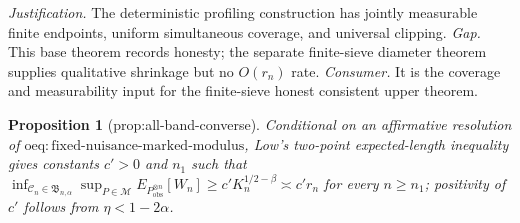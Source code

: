 \documentclass{article}
\newtheorem{proposition}{Proposition}
\begin{document}
\par\smallskip\noindent \textit{Justification.} The deterministic profiling construction has jointly measurable finite endpoints, uniform simultaneous coverage, and universal clipping. \textit{Gap.} This base theorem records honesty; the separate finite-sieve diameter theorem supplies qualitative shrinkage but no \(O(r_n)\) rate. \textit{Consumer.} It is the coverage and measurability input for the finite-sieve honest consistent upper theorem.

\begin{proposition}[prop:all-band-converse]\label{prop:all-band-converse}
Conditional on an affirmative resolution of \(\mathrm{oeq{:}fixed\text{-}nuisance\text{-}marked\text{-}modulus}\), Low's two-point expected-length inequality gives constants \(c'>0\) and \(n_1\) such that \(\inf_{\mathcal C_n\in\mathfrak B_{n,\alpha}}\sup_{P\in\mathcal M}E_{P_{\mathrm{obs}}^{\otimes n}}[W_n]\ge c'K_n^{1/2-\beta}\asymp c'r_n\) for every \(n\ge n_1\); positivity of \(c'\) follows from \(\eta<1-2\alpha\).
\end{proposition}
\end{document}
